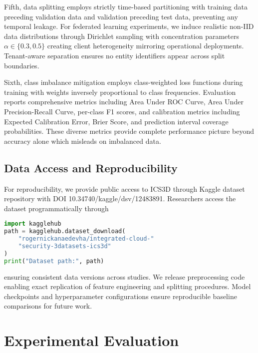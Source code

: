 \documentclass[10pt,journal,compsoc]{IEEEtran}
\begin{document}
Fifth, data splitting employs strictly time-based partitioning with training data preceding validation data and validation preceding test data, preventing any temporal leakage. For federated learning experiments, we induce realistic non-IID data distributions through Dirichlet sampling with concentration parameters $\alpha \in \{0.3, 0.5\}$ creating client heterogeneity mirroring operational deployments. Tenant-aware separation ensures no entity identifiers appear across split boundaries.

Sixth, class imbalance mitigation employs class-weighted loss functions during training with weights inversely proportional to class frequencies. Evaluation reports comprehensive metrics including Area Under ROC Curve, Area Under Precision-Recall Curve, per-class F1 scores, and calibration metrics including Expected Calibration Error, Brier Score, and prediction interval coverage probabilities. These diverse metrics provide complete performance picture beyond accuracy alone which misleads on imbalanced data.

\subsection{Data Access and Reproducibility}

For reproducibility, we provide public access to ICS3D through Kaggle dataset repository with DOI 10.34740/kaggle/dsv/12483891. Researchers access the dataset programmatically through
\begin{lstlisting}[language=Python,basicstyle=\ttfamily\small]
import kagglehub
path = kagglehub.dataset_download(
    "rogernickanaedevha/integrated-cloud-"
    "security-3datasets-ics3d"
)
print("Dataset path:", path)
\end{lstlisting}
ensuring consistent data versions across studies. We release preprocessing code enabling exact replication of feature engineering and splitting procedures. Model checkpoints and hyperparameter configurations ensure reproducible baseline comparisons for future work.

\section{Experimental Evaluation}
\label{sec:experiments}
\end{document}
